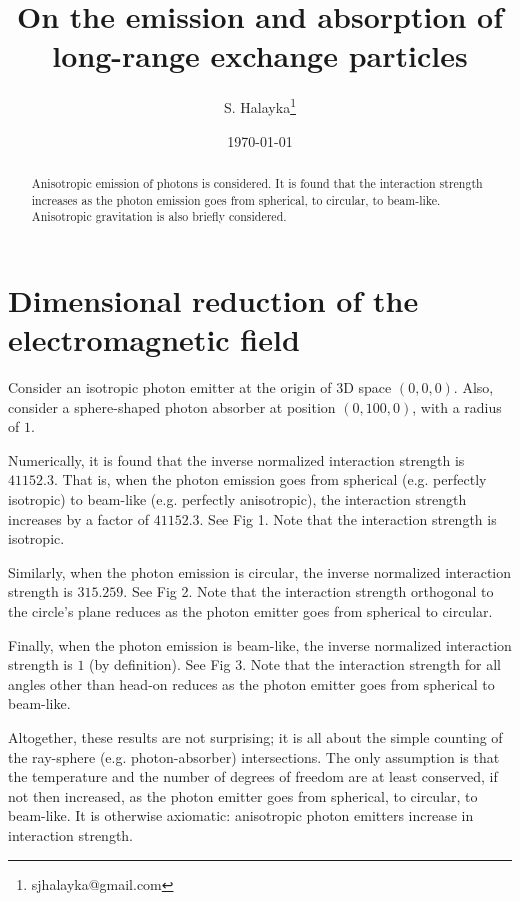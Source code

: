 \documentclass[12pt]{article}
\title{On the emission and absorption of long-range exchange particles }
\author{S. Halayka\footnote{sjhalayka@gmail.com}}
\date{\today}
\begin{document}
\maketitle

\begin{abstract}
Anisotropic emission of photons is considered.
It is found that the interaction strength increases as the photon emission goes from spherical, to circular, to beam-like.
Anisotropic gravitation is also briefly considered.
\end{abstract}



\section{Dimensional reduction of the electromagnetic field}

Consider an isotropic photon emitter at the origin of 3D space $(0, 0, 0)$.
Also, consider a sphere-shaped photon absorber at position $(0, 100, 0)$, with a radius of $1$.

Numerically, it is found that the inverse normalized interaction strength is $41152.3$.
That is, when the photon emission goes from spherical (e.g. perfectly isotropic) to beam-like (e.g. perfectly anisotropic), the interaction strength increases by a factor of $41152.3$.
See Fig 1.
Note that the interaction strength is isotropic.

Similarly, when the photon emission is circular, the inverse normalized interaction strength is $315.259$.
See Fig 2.
Note that the interaction strength orthogonal to the circle's plane reduces as the photon emitter goes from spherical to circular.

Finally, when the photon emission is beam-like, the inverse normalized interaction strength is $1$ (by definition).
See Fig 3.
Note that the interaction strength for all angles other than head-on reduces as the photon emitter goes from spherical to beam-like.

Altogether, these results are not surprising; it is all about the simple counting of the ray-sphere (e.g. photon-absorber) intersections.
The only assumption is that the temperature and the number of degrees of freedom are at least conserved, if not then increased, as the photon emitter goes from spherical, to circular, to beam-like.
It is otherwise axiomatic: anisotropic photon emitters increase in interaction strength.
\end{document}
